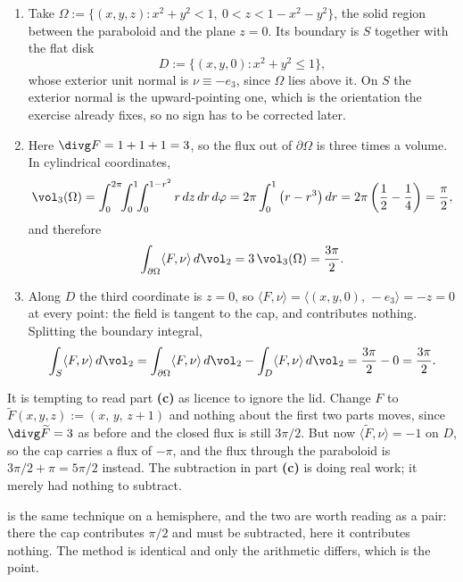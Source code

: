 \begin{exercisesolution}
\label{sol:ai_capping_a_paraboloid}
\begin{enumerate}[label=\textbf{(\alph*)}]
  \item Take $\Omega := \{(x,y,z) : x^2+y^2 < 1,\ 0 < z < 1-x^2-y^2\}$, the solid region
    between the paraboloid and the plane $z = 0$. Its boundary is $S$ together with the flat disk
    \[D := \{(x,y,0) : x^2+y^2 \leq 1\},\]
    whose exterior unit normal is $\nu \equiv -e_3$, since $\Omega$ lies above it. On $S$ the
    exterior normal is the upward-pointing one, which is the orientation the exercise already
    fixes, so no sign has to be corrected later.
  \item Here $\divg F = 1+1+1 = 3$, so the flux out of $\partial\Omega$ is three times a
    volume. In cylindrical coordinates,
    \[\vol_3(\Omega) = \int_0^{2\pi}\!\!\int_0^1\!\!\int_0^{1-r^2} r\,dz\,dr\,d\varphi
      = 2\pi\int_0^1 \big(r - r^3\big)\,dr = 2\pi\left(\frac12 - \frac14\right) = \frac{\pi}{2},\]
    and therefore
    \[\int_{\partial\Omega}\langle F,\nu\rangle\,d\vol_2 = 3\,\vol_3(\Omega) = \frac{3\pi}{2}.\]
  \item Along $D$ the third coordinate is $z = 0$, so
    $\langle F,\nu\rangle = \langle (x,y,0),\,-e_3\rangle = -z = 0$ at every point: the field is
    tangent to the cap, and contributes nothing. Splitting the boundary integral,
    \[\int_S \langle F,\nu\rangle\,d\vol_2
      = \int_{\partial\Omega}\langle F,\nu\rangle\,d\vol_2 - \int_D \langle F,\nu\rangle\,d\vol_2
      = \frac{3\pi}{2} - 0 = \frac{3\pi}{2}.\]
\end{enumerate}

\begin{remark}
\label{rem:cap_contribution_is_not_generally_zero}
It is tempting to read part \textbf{(c)} as licence to ignore the lid. Change $F$ to
$\widetilde F(x,y,z) := (x,\,y,\,z+1)$ and nothing about the first two parts moves, since
$\divg\widetilde F = 3$ as before and the closed flux is still $3\pi/2$. But now
$\langle \widetilde F,\nu\rangle = -1$ on $D$, so the cap carries a flux of $-\pi$, and the flux
through the paraboloid is $3\pi/2 + \pi = 5\pi/2$ instead. The subtraction in part \textbf{(c)}
is doing
real work; it merely had nothing to subtract.

 is the same technique on a hemisphere, and the two are worth reading as a pair:
there the cap contributes $\pi/2$ and must be subtracted, here it contributes nothing. The
method is identical and only the arithmetic differs, which is the point.
\end{remark}
\end{exercisesolution}

